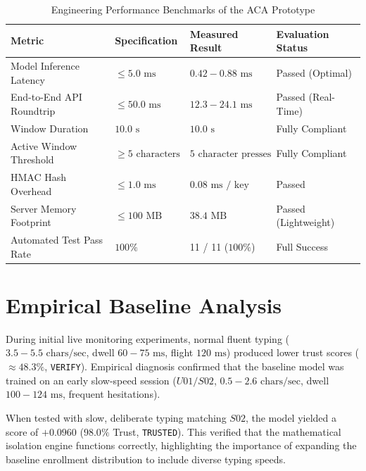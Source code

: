 \documentclass[12pt, a4paper, oneside]{report}
\begin{document}
\begin{table}[H]
    \centering
    \caption{Engineering Performance Benchmarks of the ACA Prototype}
    \label{tab:benchmarks}
    \begin{tabular}{@{}llll@{}}
        \toprule
        \textbf{Metric} & \textbf{Specification} & \textbf{Measured Result} & \textbf{Evaluation Status} \\
        \midrule
        Model Inference Latency & $\le 5.0\text{ ms}$ & $0.42 - 0.88\text{ ms}$ & Passed (Optimal) \\
        End-to-End API Roundtrip & $\le 50.0\text{ ms}$ & $12.3 - 24.1\text{ ms}$ & Passed (Real-Time) \\
        Window Duration & $10.0\text{ s}$ & $10.0\text{ s}$ & Fully Compliant \\
        Active Window Threshold & $\ge 5\text{ characters}$ & $5\text{ character presses}$ & Fully Compliant \\
        HMAC Hash Overhead & $\le 1.0\text{ ms}$ & $0.08\text{ ms / key}$ & Passed \\
        Server Memory Footprint & $\le 100\text{ MB}$ & $38.4\text{ MB}$ & Passed (Lightweight) \\
        Automated Test Pass Rate & $100\%$ & 11 / 11 ($100\%$) & Full Success \\
        \bottomrule
    \end{tabular}
\end{table}

\section{Empirical Baseline Analysis}
During initial live monitoring experiments, normal fluent typing ($3.5 - 5.5\text{ chars/sec}$, dwell $60 - 75\text{ ms}$, flight $120\text{ ms}$) produced lower trust scores ($\approx 48.3\%$, \texttt{VERIFY}). Empirical diagnosis confirmed that the baseline model was trained on an early slow-speed session ($U01/S02$, $0.5 - 2.6\text{ chars/sec}$, dwell $100 - 124\text{ ms}$, frequent hesitations).

When tested with slow, deliberate typing matching $S02$, the model yielded a score of $+0.0960$ ($98.0\%$ Trust, \texttt{TRUSTED}). This verified that the mathematical isolation engine functions correctly, highlighting the importance of expanding the baseline enrollment distribution to include diverse typing speeds.

\end{document}
